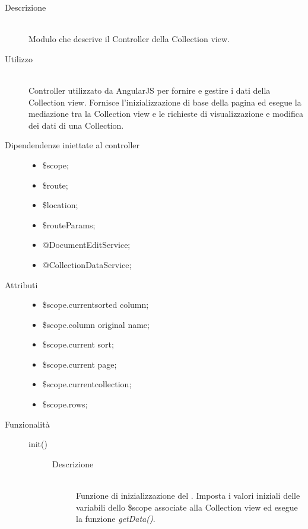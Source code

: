 \begin{description}
 \item[Descrizione] \hfill \\
 Modulo che descrive il Controller della Collection view.
 
 \item[Utilizzo] \hfill \\
 Controller utilizzato da AngularJS per fornire e gestire i dati della Collection view.
 Fornisce l'inizializzazione di base della pagina ed esegue la mediazione tra la Collection view
 e le richieste di visualizzazione e modifica dei dati di una Collection.
 
 \item[Dipendendenze iniettate al controller] \hfill
 \begin{itemize}
  \item \$scope;
  \item \$route;
  \item \$location;
  \item \$routeParams;
  \item @DocumentEditService;
  \item @CollectionDataService;
 \end{itemize}
 
 \item[Attributi] \hfill
 \begin{itemize}
 \item \$scope.current\textunderscore sorted \textunderscore column;
 \item \$scope.column \textunderscore original \textunderscore name;
 \item \$scope.current \textunderscore sort;
 \item \$scope.current \textunderscore page;
 \item \$scope.current\textunderscore collection;
 \item \$scope.rows;
 \end{itemize}
 
 \item[Funzionalità] \hfill
 \begin{description}
  \item[init()] \hfill
  	\begin{description}
  		\item[Descrizione] \hfill \\
  Funzione di inizializzazione del . Imposta i valori iniziali delle variabili dello
  \$scope associate alla Collection view ed esegue la funzione \textit{getData()}.
  	\end{description}
  	

\end{description}
\end{description}
